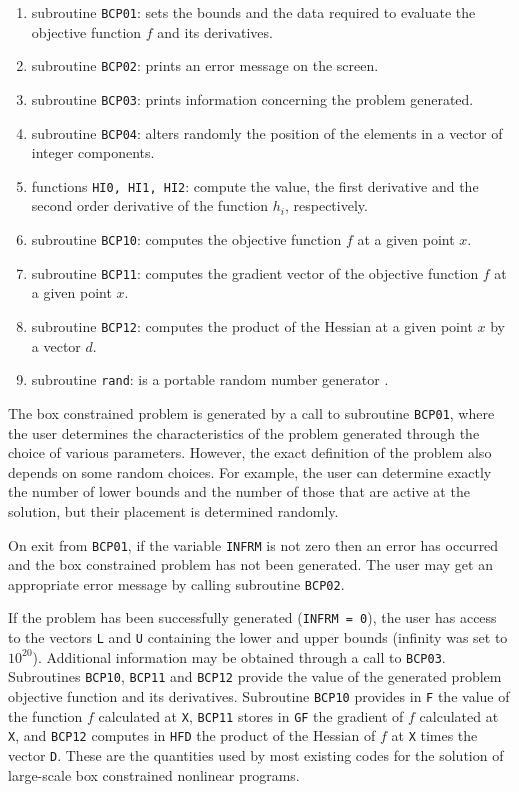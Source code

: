\begin{enumerate}
\item subroutine {\tt BCP01}: sets the bounds and
the data required to evaluate the objective function $f$ and its 
derivatives.
\item subroutine {\tt BCP02}: prints an error message on the screen. 
\item subroutine {\tt BCP03}: prints information concerning the problem 
generated.
\item subroutine {\tt BCP04}: alters randomly the position of the 
elements in a vector of integer components. 
\item functions {\tt HI0, HI1, HI2}: compute the value, the
first derivative and the second order derivative of the 
function $h_i$, respectively. 
\item subroutine {\tt BCP10}: computes the objective function $f$ at a 
given point $x$. 
\item subroutine {\tt BCP11}:  computes the gradient vector of the
objective function $f$ at a given point $x$.
\item subroutine {\tt BCP12}: computes the product of the Hessian 
at a given point $x$ by a vector $d$.
\item subroutine {\tt rand\/}: is a portable random 
number generator \cite{schrage79}.
\end{enumerate}


The box constrained problem is generated by a call to 
subroutine {\tt BCP01}, where the user determines the characteristics of the 
problem generated through the choice of various parameters. 
However, the exact definition of the problem also 
depends on some random choices. For example, the user can determine exactly 
the  number of lower bounds and the number of those that are
active at the solution, but their placement is determined randomly. 

On exit from {\tt BCP01}, if the variable {\tt INFRM} is 
not zero then an error has occurred and
the box constrained problem has not been generated. The user may 
get an appropriate error message by calling subroutine {\tt BCP02}.

If the problem has been successfully generated ({\tt INFRM = 0}), 
the user has access to the vectors {\tt L} and {\tt U} containing the lower and 
upper bounds  (infinity was set to $10^{20}$). Additional information may be
obtained through a call to {\tt BCP03}. 
Subroutines {\tt BCP10}, {\tt BCP11} and   {\tt BCP12} provide
the value of the generated problem objective function and its derivatives.
Subroutine  {\tt BCP10} provides in {\tt F} the value of the function 
$f$ calculated at {\tt X}, {\tt BCP11} stores in {\tt GF} the gradient of $f$ 
calculated at {\tt X}, and {\tt BCP12} computes in  {\tt HFD} the product of the
Hessian of $f$ at {\tt X} times the vector {\tt D}.
These are the quantities used by most existing codes for the solution 
of large-scale box constrained nonlinear programs. 


